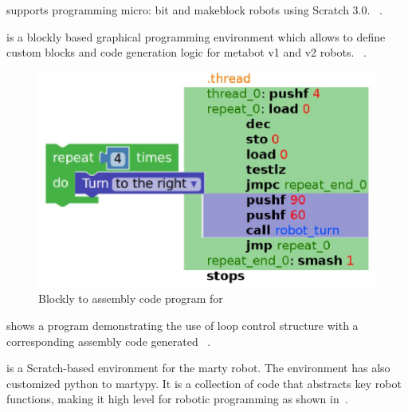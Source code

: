 \parhead{\makeblock} supports programming micro: bit and makeblock robots using Scratch 3.0. %
~\cite{Makeblock}.

\parhead{\metabot} is a blockly based graphical programming environment which allows to define custom blocks and code generation logic for metabot v1 and v2 robots. %
~\cite{Passault2016,Metabot}.

\begin{figure}[t]
     \centering
    \includegraphics[width=.9\columnwidth]{metabotsample.jpg}
      \caption{Blockly to assembly code program for \metabot\,\cite{Passault2016} }
      \label{metabot}
   \end{figure}

 shows a program demonstrating the use of loop control structure with a corresponding assembly code generated ~\cite{Metabot,Passault2016}.

\parhead{\marty} is a Scratch-based environment for the marty robot. The environment has also customized python to martypy. It is a collection of code that abstracts key robot functions, making it high level for robotic programming as shown in \,\cite{Marty}. 

